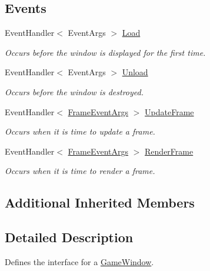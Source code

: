\subsection*{Events}
\begin{DoxyCompactItemize}
\item 
Event\-Handler$<$ Event\-Args $>$ \hyperlink{interface_open_t_k_1_1_platform_1_1_i_game_window_a59759b2288998cda597bcd28f72994da}{Load}
\begin{DoxyCompactList}\small\item\em Occurs before the window is displayed for the first time. \end{DoxyCompactList}\item 
Event\-Handler$<$ Event\-Args $>$ \hyperlink{interface_open_t_k_1_1_platform_1_1_i_game_window_a493b559f07695d05b9a62a4fb7f8addb}{Unload}
\begin{DoxyCompactList}\small\item\em Occurs before the window is destroyed. \end{DoxyCompactList}\item 
Event\-Handler$<$ \hyperlink{class_open_t_k_1_1_frame_event_args}{Frame\-Event\-Args} $>$ \hyperlink{interface_open_t_k_1_1_platform_1_1_i_game_window_adb51747b40dcd20623f79ab492e28cd7}{Update\-Frame}
\begin{DoxyCompactList}\small\item\em Occurs when it is time to update a frame. \end{DoxyCompactList}\item 
Event\-Handler$<$ \hyperlink{class_open_t_k_1_1_frame_event_args}{Frame\-Event\-Args} $>$ \hyperlink{interface_open_t_k_1_1_platform_1_1_i_game_window_a93a6ae6565e74397cb44c57e99f55867}{Render\-Frame}
\begin{DoxyCompactList}\small\item\em Occurs when it is time to render a frame. \end{DoxyCompactList}\end{DoxyCompactItemize}
\subsection*{Additional Inherited Members}


\subsection{Detailed Description}
Defines the interface for a \hyperlink{class_open_t_k_1_1_game_window}{Game\-Window}. 



